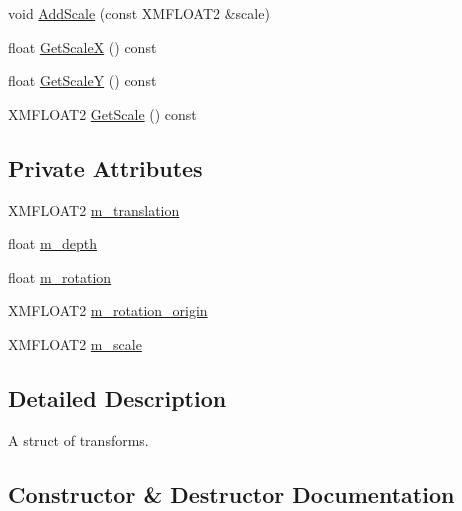 \begin{DoxyCompactItemize}
\item 
void \hyperlink{structmage_1_1_sprite_transform_a2310f5a1d31bc6a42b5f1e6e0490f5f6}{Add\+Scale} (const X\+M\+F\+L\+O\+A\+T2 \&scale)
\item 
float \hyperlink{structmage_1_1_sprite_transform_ae192203af55097b4e296ce0cb916cd97}{Get\+ScaleX} () const
\item 
float \hyperlink{structmage_1_1_sprite_transform_ad25f6881510e258a5afb00ae9ad7bc87}{Get\+ScaleY} () const
\item 
X\+M\+F\+L\+O\+A\+T2 \hyperlink{structmage_1_1_sprite_transform_ab9a7dcdbf3013960942ff98df313a92d}{Get\+Scale} () const
\end{DoxyCompactItemize}
\subsection*{Private Attributes}
\begin{DoxyCompactItemize}
\item 
X\+M\+F\+L\+O\+A\+T2 \hyperlink{structmage_1_1_sprite_transform_a7642907ec8ae9685bb7c56675607045b}{m\+\_\+translation}
\item 
float \hyperlink{structmage_1_1_sprite_transform_a9a61159b9f52e5cc18c0f8cea378714c}{m\+\_\+depth}
\item 
float \hyperlink{structmage_1_1_sprite_transform_a6fcb43d224953ea5f38ef54c4e10e003}{m\+\_\+rotation}
\item 
X\+M\+F\+L\+O\+A\+T2 \hyperlink{structmage_1_1_sprite_transform_ae51ebd0226ef4b569b6a66884823bd18}{m\+\_\+rotation\+\_\+origin}
\item 
X\+M\+F\+L\+O\+A\+T2 \hyperlink{structmage_1_1_sprite_transform_a7532d4d41d02b5fa6f31eeb4fd4fd886}{m\+\_\+scale}
\end{DoxyCompactItemize}


\subsection{Detailed Description}
A struct of transforms. 

\subsection{Constructor \& Destructor Documentation}
\hypertarget{structmage_1_1_sprite_transform_a60ab10912457ce7939c181fc67633fcf}{}\label{structmage_1_1_sprite_transform_a60ab10912457ce7939c181fc67633fcf} 
